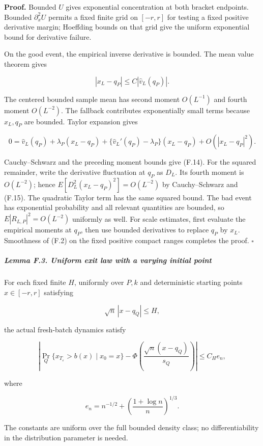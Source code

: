 \textbf{Proof.} Bounded \(U\) gives exponential concentration at both
bracket endpoints. Bounded \(\partial_x^2U\) permits a fixed finite grid
on \([-r,r]\) for testing a fixed positive derivative margin; Hoeffding
bounds on that grid give the uniform exponential bound for derivative
failure.

On the good event, the empirical inverse derivative is bounded. The mean
value theorem gives

\[
|x_L-q_P|\le C|\widehat v_L(q_P)|.
\]

The centered bounded sample mean has second moment \(O(L^{-1})\) and
fourth moment \(O(L^{-2})\). The fallback contributes exponentially
small terms because \(x_L,q_P\) are bounded. Taylor expansion gives

\[
0=\widehat v_L(q_P)+\lambda_P(x_L-q_P)
 +\{\widehat v_L'(q_P)-\lambda_P\}(x_L-q_P)
 +O(|x_L-q_P|^2).
\]

Cauchy--Schwarz and the preceding moment bounds give (F.14). For the
squared remainder, write the derivative fluctuation at \(q_P\) as
\(D_L\). Its fourth moment is \(O(L^{-2})\); hence
\(E[D_L^2(x_L-q_P)^2]=O(L^{-2})\) by Cauchy--Schwarz and (F.15). The
quadratic Taylor term has the same squared bound. The bad event has
exponential probability and all relevant quantities are bounded, so
\(E|R_{L,P}|^2=O(L^{-2})\) uniformly as well. For scale estimates, first
evaluate the empirical moments at \(q_P\), then use bounded derivatives
to replace \(q_P\) by \(x_L\). Smoothness of (F.2) on the fixed positive
compact ranges completes the proof. \(\square\)

\subparagraph{Lemma F.3. Uniform exit law with a varying initial
point}\label{lemma-f.3.-uniform-exit-law-with-a-varying-initial-point}

For each fixed finite \(H\), uniformly over \(P,k\) and deterministic
starting points \(x\in[-r,r]\) satisfying

\[
\sqrt n\,|x-q_Q|\le H,
\]

the actual fresh-batch dynamics satisfy

\[
\left|
\Pr_Q\{x_{T_\varepsilon}>b(x)\mid x_0=x\}
-\Phi\!\left(\frac{\sqrt n(x-q_Q)}{s_Q}\right)
\right|\le C_H e_n,
\tag{F.16}
\]

where

\[
e_n=n^{-1/2}+\left(\frac{1+\log n}{n}\right)^{1/3}.
\]

The constants are uniform over the full bounded density class; no
differentiability in the distribution parameter is needed.

